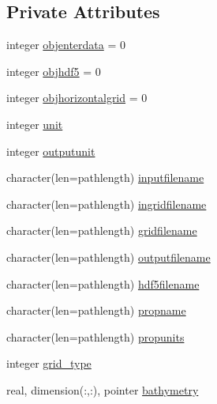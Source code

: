\subsection*{Private Attributes}
\begin{DoxyCompactItemize}
\item 
integer \mbox{\hyperlink{structmoduleera40format_1_1t__era40format_a943586ed64ffbad3888fe6df0e5fbf95}{objenterdata}} = 0
\item 
integer \mbox{\hyperlink{structmoduleera40format_1_1t__era40format_af09737830171c015ce43b79560c27cf4}{objhdf5}} = 0
\item 
integer \mbox{\hyperlink{structmoduleera40format_1_1t__era40format_a614c6551671e5b5c30b4d20d4c34f120}{objhorizontalgrid}} = 0
\item 
integer \mbox{\hyperlink{structmoduleera40format_1_1t__era40format_aa6e5b9cdebcf1cebeb9869026954cdb3}{unit}}
\item 
integer \mbox{\hyperlink{structmoduleera40format_1_1t__era40format_aa88ef4fff318c92adf15cc9f512c444a}{outputunit}}
\item 
character(len=pathlength) \mbox{\hyperlink{structmoduleera40format_1_1t__era40format_a04de0d6b9726addcd4260d23f818b43e}{inputfilename}}
\item 
character(len=pathlength) \mbox{\hyperlink{structmoduleera40format_1_1t__era40format_a99f186e2d80c49785934506b1a8bfa39}{ingridfilename}}
\item 
character(len=pathlength) \mbox{\hyperlink{structmoduleera40format_1_1t__era40format_a984aa55d8cf988e0bb46737be1ef189d}{gridfilename}}
\item 
character(len=pathlength) \mbox{\hyperlink{structmoduleera40format_1_1t__era40format_a603d750fcd159977619c841a2bd2ed97}{outputfilename}}
\item 
character(len=pathlength) \mbox{\hyperlink{structmoduleera40format_1_1t__era40format_aefb09fca20e5d4968962bbdb871349e0}{hdf5filename}}
\item 
character(len=pathlength) \mbox{\hyperlink{structmoduleera40format_1_1t__era40format_a52fa5a61d5161f9b906bd7146c265f7a}{propname}}
\item 
character(len=pathlength) \mbox{\hyperlink{structmoduleera40format_1_1t__era40format_a30386644b7bc8a0b5dc05c3eb59810d9}{propunits}}
\item 
integer \mbox{\hyperlink{structmoduleera40format_1_1t__era40format_a710c546f2f1c9d7a0989d86129015da3}{grid\+\_\+type}}
\item 
real, dimension(\+:,\+:), pointer \mbox{\hyperlink{structmoduleera40format_1_1t__era40format_ad1eb540cc5f57e8f7ae593bdb62e77c3}{bathymetry}}

\end{DoxyCompactItemize}
